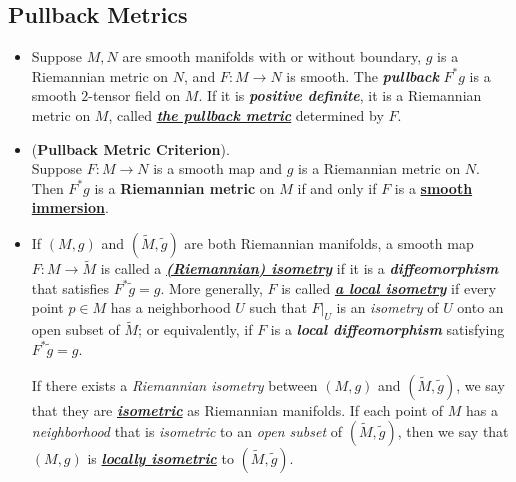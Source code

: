\documentclass[11pt]{article}
\begin{document}
\subsection{Pullback Metrics}
\begin{itemize}
\item  \begin{definition}
Suppose $M, N$ are smooth manifolds with or without boundary, $g$ is a Riemannian metric on $N$, and $F: M \rightarrow N$ is smooth. The \emph{\textbf{pullback}} $F^{*}g$ is a smooth $2$-tensor field on $M$. If it is \emph{\textbf{positive definite}}, it is a Riemannian metric on $M$, called \underline{\emph{\textbf{the pullback metric}}} determined by $F$. 
\end{definition}


\item \begin{proposition} (\textbf{Pullback Metric Criterion}). \citep{lee2003introduction} \\
Suppose $F: M \rightarrow N$ is a smooth map and $g$ is a Riemannian metric on $N$. Then $F^{*}g$ is a \textbf{Riemannian metric} on $M$ if and only if $F$ is a \underline{\textbf{smooth immersion}}.
\end{proposition}

\item \begin{definition}
If $(M, g)$ and  $(\widetilde{M}, \widetilde{g})$ are both Riemannian manifolds, a smooth map  $F: M \rightarrow \widetilde{M}$ is called a \underline{\emph{\textbf{(Riemannian) isometry}}} if it is a \emph{\textbf{diffeomorphism}} that satisfies $F^{*}\widetilde{g} = g$. More generally, $F$ is called \underline{\emph{\textbf{a local isometry}}} if every point $p \in M$ has a neighborhood $U$ such that $F|_{U}$ is an \emph{isometry} of $U$ onto an open subset of $\widetilde{M}$; or equivalently, if $F$ is a \emph{\textbf{local diffeomorphism}} satisfying $F^{*}\widetilde{g} = g$.

If there exists a \emph{Riemannian isometry} between $(M, g)$ and  $(\widetilde{M}, \widetilde{g})$, we say that they are \underline{\emph{\textbf{isometric}}} as Riemannian manifolds. If each point of $M$ has a \emph{neighborhood} that is \emph{isometric} to an \emph{open subset} of $(\widetilde{M}, \widetilde{g})$, then we say that $(M, g)$ is \underline{\emph{\textbf{locally isometric}}} to $(\widetilde{M}, \widetilde{g})$.
\end{definition}


\end{itemize}
\end{document}
